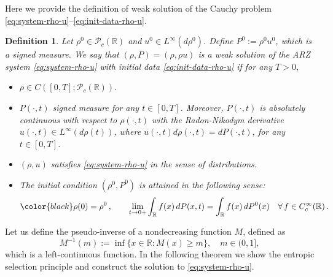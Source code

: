 \documentclass[11pt,a4paper,oneside]{amsart}
\newtheorem{definition}{Definition}[section]
\newcommand\R{\mathbb{R}}
\newcommand{\PP}{\mathcal{P}}
\begin{document}
{\color{black} Here we provide the definition of weak solution of the Cauchy problem \eqref{eq:system-rho-u}--\eqref{eq:init-data-rho-u}.}
\begin{definition}\label{definition:weak-solution-rho-u}
    Let $\rho^0\in\PP_c(\R)$ and $u^0\in L^\infty(d\rho^0)$. Define $P^0:=\rho^0 u^0$, which is a signed measure. 
    We say that $(\rho,P)=(\rho,\rho u)$ is a weak solution of the ARZ system \eqref{eq:system-rho-u} with initial data \eqref{eq:init-data-rho-u} if for any $T>0$,
    \begin{itemize}
        \item $\rho\in C([0,T];\PP_c(\R))$.
        \item $P(\cdot,t)$ signed measure for any $t\in[0,T]$. Moreover, $P(\cdot,t)$ is absolutely continuous 
        with respect to $\rho(\cdot,t)$ with the Radon-Nikodym derivative $u(\cdot,t)\in L^\infty(d\rho(t))$, 
        where $u(\cdot,t)d\rho(\cdot,t)=dP(\cdot,t)$, for any $t\in[0,T]$.
        \item $(\rho,u)$ satisfies \eqref{eq:system-rho-u} in the sense of distributions.
        \item The initial condition $(\rho^0,P^0)$ is attained in the following sense: 
        $$
        {\color{black} \rho(0)=\rho^0}\,,\qquad \lim_{t\to0+}\int_\R f(x)\,dP(x,t)=\int_\R f(x)\,dP^0(x) \quad \forall \,   f\in C_c^\infty(\R)\,.     
        $$
    \end{itemize}
\end{definition}
Let us define the pseudo-inverse of a nondecreasing function $M$, defined as
$$
M^{-1}(m):=\inf\{ x\in\R:M(x)\geq m\},\quad m\in (0,1],
$$
which is a left-continuous function. 
In the following theorem we show the entropic selection principle and construct the solution to \eqref{eq:system-rho-u}.
\end{document}
